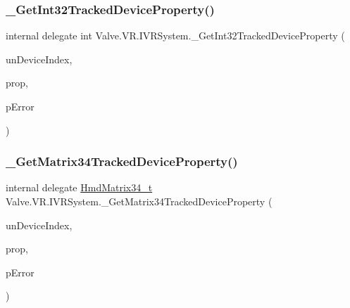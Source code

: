 \mbox{\label{struct_valve_1_1_v_r_1_1_i_v_r_system_a0201a1804a9833cfe2834c810ee97893}} 
\subsubsection{\texorpdfstring{\_GetInt32TrackedDeviceProperty()}{\_GetInt32TrackedDeviceProperty()}}
{\footnotesize\ttfamily internal delegate int Valve.\+V\+R.\+I\+V\+R\+System.\+\_\+\+Get\+Int32\+Tracked\+Device\+Property (\begin{DoxyParamCaption}\item[{uint}]{un\+Device\+Index,  }\item[{\mbox{\hyperlink{namespace_valve_1_1_v_r_ab060521ead7273986988fc4897e52482}{E\+Tracked\+Device\+Property}}}]{prop,  }\item[{ref \mbox{\hyperlink{namespace_valve_1_1_v_r_aab6684f03930a2d2cf22ed66b437e47b}{E\+Tracked\+Property\+Error}}}]{p\+Error }\end{DoxyParamCaption})}

\mbox{\label{struct_valve_1_1_v_r_1_1_i_v_r_system_add3a6aac11e39d31852a68b40434aa72}} 
\subsubsection{\texorpdfstring{\_GetMatrix34TrackedDeviceProperty()}{\_GetMatrix34TrackedDeviceProperty()}}
{\footnotesize\ttfamily internal delegate \mbox{\hyperlink{struct_valve_1_1_v_r_1_1_hmd_matrix34__t}{Hmd\+Matrix34\+\_\+t}} Valve.\+V\+R.\+I\+V\+R\+System.\+\_\+\+Get\+Matrix34\+Tracked\+Device\+Property (\begin{DoxyParamCaption}\item[{uint}]{un\+Device\+Index,  }\item[{\mbox{\hyperlink{namespace_valve_1_1_v_r_ab060521ead7273986988fc4897e52482}{E\+Tracked\+Device\+Property}}}]{prop,  }\item[{ref \mbox{\hyperlink{namespace_valve_1_1_v_r_aab6684f03930a2d2cf22ed66b437e47b}{E\+Tracked\+Property\+Error}}}]{p\+Error }\end{DoxyParamCaption})}

